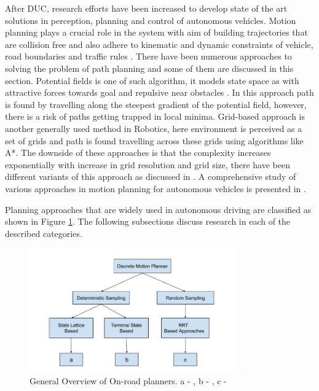 After DUC, research efforts have been increased to develop state of the art solutions in perception, planning and control of autonomous vehicles. Motion planning plays a crucial role in the system with aim of building trajectories that are collision free and also adhere to kinematic and dynamic constraints of vehicle, road boundaries and traffic rules \cite{motion_planning_techniques}. There have been numerous approaches to solving the problem of path planning and some of them are discussed in this section. Potential fields is one of such algorithm, it models state space as with attractive forces towards goal and repulsive near obstacles \cite{potential_field_3} \cite{potential_field_1} \cite{potential_field_2}. In this approach path is found by travelling along the steepest gradient of the potential field, however, there is a risk of paths getting trapped in local minima. Grid-based approach is another generally used method in Robotics, here environment is perceived as a set of grids and path is found travelling across these grids using algorithms like A*. The downside of these approaches is that the complexity increases exponentially with increase in grid resolution and grid size, there have been different variants of this approach as discussed in \cite{A_star} \cite{D_star_1} \cite{kolski_thesis}. A comprehensive study of various approaches in motion planning for autonomous vehicles is presented in \cite{motion_planning_techniques} \cite{survey_planning_techniques}.

 Planning approaches that are widely used in autonomous driving are classified as shown in Figure \ref{related_work_classification}. The following subsections discuss research in each of the described categories. 

\begin{figure}[H]
	\centering
	\includegraphics[width=0.8\textwidth]{Images/related_work/planning_division.png}
	\caption{General Overview of On-road planners. a - \cite{cmu_parallel_thesis}  \cite{diss_shui_phd_thesis} \cite{traj_planner_optimization} \cite{lattice_Gu_Tiyanu} \cite{unit_A_star} , b - \cite{kolski_thesis} \cite{real_time_traj_plan_article} \cite{darpa_urban_challenge}, c -\cite{rrt_star} \cite{rrt_urban_driv} \cite{mit_rrt}
	}
	\label{related_work_classification}
\end{figure}

